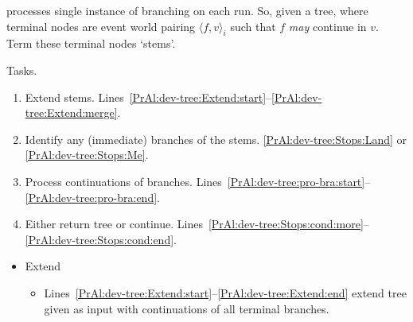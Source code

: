 \begin{note}
  \AlgDevelopTree{} processes single instance of branching on each run.
  So, given a tree, where terminal nodes are event world pairing \(\langle f,v \rangle_{i}\) such that \(f\) \emph{may} continue in \(v\).
  Term these terminal nodes `stems'.

  Tasks.
  \begin{enumerate}
  \item
    Extend stems.%
    \hfill%
    Lines~\ref{PrAl:dev-tree:Extend:start}--\ref{PrAl:dev-tree:Extend:merge}.
  \item
    Identify any (immediate) branches of the stems.%
    \hfill%
    \autoref{PrAl:dev-tree:Stops:Land} or \autoref{PrAl:dev-tree:Stops:Me}.
  \item
    Process continuations of branches.%
    \hfill%
    Lines~\ref{PrAl:dev-tree:pro-bra:start}--\ref{PrAl:dev-tree:pro-bra:end}.
  \item
    Either return tree or continue.%
    \hfill%
    Lines~\ref{PrAl:dev-tree:Stops:cond:more}--\ref{PrAl:dev-tree:Stops:cond:end}.
  \end{enumerate}

  \begin{itemize}
  \item
    Extend
    \begin{itemize}
    \item
      Lines~\ref{PrAl:dev-tree:Extend:start}--\ref{PrAl:dev-tree:Extend:end} extend tree given as input with continuations of all terminal branches.


\end{itemize}
\end{itemize}
\end{note}

